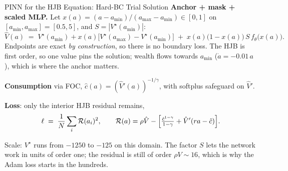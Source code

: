 \documentclass[aspectratio=169,11pt]{beamer}
\newcommand{\emphc}[1]{\textcolor{harvardcrimson}{#1}}
\begin{document}
\begin{frame}{PINN for the HJB Equation: Hard-BC Trial Solution}
\textbf{Anchor + mask + scaled MLP.}  Let $x(a) = (a-a_{\min})/(a_{\max}-a_{\min}) \in [0,1]$ on $[a_{\min}, a_{\max}] = [0.5, 5]$, and $S = |V^\star(a_{\min})|$:
\[
\hat V(a) \;=\; V^\star(a_{\min}) + x(a)\bigl[V^\star(a_{\max}) - V^\star(a_{\min})\bigr] \;+\; x(a)\bigl(1-x(a)\bigr)\,S\,f_\theta\bigl(x(a)\bigr).
\]
Endpoints are exact \emph{by construction}, so there is no boundary loss. The HJB is first order, so one value pins the solution; wealth flows towards $a_{\min}$ ($\dot a = -0.01\,a$), which is where the anchor matters.

\vspace{0.3em}
\textbf{Consumption} via FOC, $\hat c(a) = (\hat V'(a))^{-1/\gamma}$, with softplus safeguard on $\hat V'$.

\vspace{0.3em}
\textbf{Loss}: only the interior HJB residual remains,
\[
\ell \;=\; \frac{1}{N}\sum_{i}\mathcal{R}(a_i)^2,
\qquad
\mathcal{R}(a) = \rho\hat V - \Bigl[\tfrac{\hat c^{1-\gamma}}{1-\gamma} + \hat V'(ra - \hat c)\Bigr].
\]

\vspace{0.2em}
{\small \emphc{Scale:} $V^\star$ runs from $-1250$ to $-125$ on this domain. The factor $S$ lets the network work in units of order one; the residual is still of order $\rho V \sim 16$, which is why the Adam loss starts in the hundreds.}
\end{frame}
\end{document}
